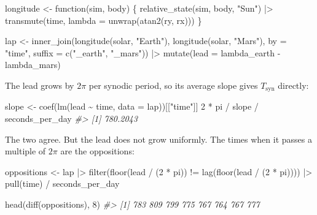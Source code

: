 \documentclass[
  10.5pt,
  letterpaper,
]{scrbook}
\newenvironment{Shaded}{\begin{snugshade}}{\end{snugshade}}
\newcommand{\AttributeTok}[1]{\textcolor[rgb]{0.00,0.00,0.00}{#1}}
\newcommand{\CommentTok}[1]{\textcolor[rgb]{0.00,0.00,0.00}{\textit{#1}}}
\newcommand{\ControlFlowTok}[1]{\textcolor[rgb]{0.00,0.00,0.00}{#1}}
\newcommand{\DecValTok}[1]{\textcolor[rgb]{0.00,0.00,0.00}{#1}}
\newcommand{\FunctionTok}[1]{\textcolor[rgb]{0.00,0.00,0.00}{#1}}
\newcommand{\NormalTok}[1]{\textcolor[rgb]{0.00,0.00,0.00}{#1}}
\newcommand{\OtherTok}[1]{\textcolor[rgb]{0.00,0.00,0.00}{#1}}
\newcommand{\SpecialCharTok}[1]{\textcolor[rgb]{0.00,0.00,0.00}{#1}}
\newcommand{\StringTok}[1]{\textcolor[rgb]{0.00,0.00,0.00}{#1}}
\theoremstyle{plain}
\theoremstyle{remark}
\begin{document}
\begin{Shaded}
\begin{Highlighting}[]
\NormalTok{longitude }\OtherTok{\textless{}{-}} \ControlFlowTok{function}\NormalTok{(sim, body) \{}
  \FunctionTok{relative\_state}\NormalTok{(sim, body, }\StringTok{"Sun"}\NormalTok{) }\SpecialCharTok{|\textgreater{}}
    \FunctionTok{transmute}\NormalTok{(time, }\AttributeTok{lambda =} \FunctionTok{unwrap}\NormalTok{(}\FunctionTok{atan2}\NormalTok{(ry, rx)))}
\NormalTok{\}}

\NormalTok{lap }\OtherTok{\textless{}{-}} \FunctionTok{inner\_join}\NormalTok{(}\FunctionTok{longitude}\NormalTok{(solar, }\StringTok{"Earth"}\NormalTok{), }\FunctionTok{longitude}\NormalTok{(solar, }\StringTok{"Mars"}\NormalTok{),}
                  \AttributeTok{by =} \StringTok{"time"}\NormalTok{, }\AttributeTok{suffix =} \FunctionTok{c}\NormalTok{(}\StringTok{"\_earth"}\NormalTok{, }\StringTok{"\_mars"}\NormalTok{)) }\SpecialCharTok{|\textgreater{}}
  \FunctionTok{mutate}\NormalTok{(}\AttributeTok{lead =}\NormalTok{ lambda\_earth }\SpecialCharTok{{-}}\NormalTok{ lambda\_mars)}
\end{Highlighting}
\end{Shaded}

The lead grows by \(2\pi\) per synodic period, so its average slope
gives \(T_{\mathrm{syn}}\) directly:

\begin{Shaded}
\begin{Highlighting}[]
\NormalTok{slope }\OtherTok{\textless{}{-}} \FunctionTok{coef}\NormalTok{(}\FunctionTok{lm}\NormalTok{(lead }\SpecialCharTok{\textasciitilde{}}\NormalTok{ time, }\AttributeTok{data =}\NormalTok{ lap))[[}\StringTok{"time"}\NormalTok{]]}
\DecValTok{2} \SpecialCharTok{*}\NormalTok{ pi }\SpecialCharTok{/}\NormalTok{ slope }\SpecialCharTok{/}\NormalTok{ seconds\_per\_day}
\CommentTok{\#\textgreater{} [1] 780.2043}
\end{Highlighting}
\end{Shaded}

The two agree. But the lead does not grow uniformly. The times when it
passes a multiple of \(2\pi\) are the oppositions:

\begin{Shaded}
\begin{Highlighting}[]
\NormalTok{oppositions }\OtherTok{\textless{}{-}}\NormalTok{ lap }\SpecialCharTok{|\textgreater{}}
  \FunctionTok{filter}\NormalTok{(}\FunctionTok{floor}\NormalTok{(lead }\SpecialCharTok{/}\NormalTok{ (}\DecValTok{2} \SpecialCharTok{*}\NormalTok{ pi)) }\SpecialCharTok{!=} \FunctionTok{lag}\NormalTok{(}\FunctionTok{floor}\NormalTok{(lead }\SpecialCharTok{/}\NormalTok{ (}\DecValTok{2} \SpecialCharTok{*}\NormalTok{ pi)))) }\SpecialCharTok{|\textgreater{}}
  \FunctionTok{pull}\NormalTok{(time) }\SpecialCharTok{/}\NormalTok{ seconds\_per\_day}

\FunctionTok{head}\NormalTok{(}\FunctionTok{diff}\NormalTok{(oppositions), }\DecValTok{8}\NormalTok{)}
\CommentTok{\#\textgreater{} [1] 783 809 799 775 767 764 767 777}
\end{Highlighting}
\end{Shaded}
\end{document}
